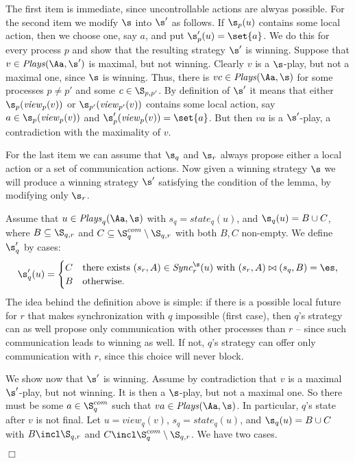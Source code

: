 \documentclass{llncs}
\newcommand{\Sync}{\mathit{Sync}}
\newcommand{\state}{\mathit{state}}
\newcommand{\Plays}{\mathit{Plays}}
\newcommand{\view}{\mathit{view}}
\renewenvironment{proof}{{\em Proof. }}{\nopagebreak
  \hspace*{\fill}$\Box$}
\begin{document}
\begin{proof}
  The first item is immediate, since uncontrollable actions are alwyas
  possible. For the second item we modify $\s$ into $\s'$ as
  follows. If $\s_p(u)$ contains some local action, then we choose
  one, say $a$, and put $\s'_p(u)=\set{a}$. We do this for every
  process $p$ and show that the resulting strategy $\s'$ is
  winning. Suppose that $v \in \Plays(\Aa,\s')$ is maximal, but not
  winning. Clearly $v$ is a $\s$-play, but not a maximal one, since
  $\s$ is winning.  Thus, there is $vc \in \Plays(\Aa,\s)$ for some
  processes $p \not=p'$ and some $c \in \S_{p,p'}$. By definition of
  $\s'$ it means that either $\s_p(\view_p(v))$ or
  $\s_{p'}(\view_{p'}(v))$ contains some local action, say $a \in
  \s_p(\view_p(v))$ and $\s'_p(\view_p(v))=\set{a}$. But then $va$ is
  a $\s'$-play, a contradiction with the maximality of $v$.

For the last item we can assume that $\s_q$ and $\s_r$ always
  propose either a local action or a set of communication actions. Now
  given a winning strategy $\s$ we will produce a winning strategy
  $\s'$ satisfying the condition of the lemma, by modifying only $\s_r$.

 Assume that $u \in \Plays_q(\Aa,\s)$ with $s_q=\state_q(u)$, and
 $\s_q(u)=B \cup C$, where $B 
 \subseteq \S_{q,r}$ and $C \subseteq \S_q^{com} \setminus \S_{q,r}$
 with both $B,C$  non-empty.
 We define $\s'_q$ by cases:
 \begin{equation*}
   \s'_q(u)=\begin{cases}
     C & \text{there exists $(s_r,A)\in\Sync^{\s}_r(u)$ with
       $(s_r,A) \bowtie (s_q,B)=\es$,}\\
     B & \text{otherwise}.
   \end{cases}
 \end{equation*}
The idea behind the definition above is simple: if there is a possible
local future for $r$ that makes synchronization with $q$ impossible (first
case), then $q$'s strategy can as well propose only communication with
other processes than $r$ -- since such communication leads to winning
as well. If not, $q$'s strategy can  offer only communication with $r$,
since this choice will never block.

We show now that $\s'$ is winning.  Assume by contradiction that $v$
is a maximal $\s'$-play, but not winning.  It is then a $\s$-play, but
not a maximal one. So there must be some $a \in \S_q^{com}$ such that
$va \in \Plays(\Aa,\s)$.  In particular, $q$'s state after $v$ is not
final.  Let $u=\view_q(v)$, $s_q=\state_q(u)$, and $\s_q(u)=B\cup C$
with $B\incl \S_{q,r}$ and $C\incl \S^{com}_q\setminus \S_{q,r}$. We
have two cases.


\end{proof}
\end{document}
